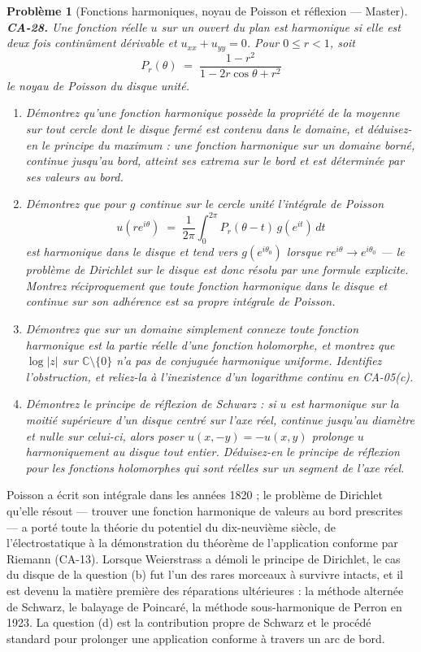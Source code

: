 \documentclass[11pt]{article}
\newtheorem{problem}{Problème}
\begin{document}
\begin{problem}[{Fonctions harmoniques, noyau de Poisson et réflexion --- Master}]
\textbf{CA-28.} Une fonction réelle $ u $ sur un ouvert du plan est \textit{harmonique} si elle
est deux fois continûment dérivable et $ u_{xx} + u_{yy} = 0 $. Pour $ 0 \le r < 1 $, soit
\[ P_r(\theta) \;=\; \frac{1 - r^2}{1 - 2r\cos\theta + r^2} \]
le noyau de Poisson du disque unité.
\begin{enumerate}
\item[(a)] Démontrez qu'une fonction harmonique possède la propriété de la moyenne sur tout cercle dont le
disque fermé est contenu dans le domaine, et déduisez-en le principe du maximum : une fonction
harmonique sur un domaine borné, continue jusqu'au bord, atteint ses extrema sur le bord et est
déterminée par ses valeurs au bord.
\item[(b)] Démontrez que pour $ g $ continue sur le cercle unité l'intégrale de Poisson
\[ u(re^{i\theta}) \;=\; \frac{1}{2\pi} \int_0^{2\pi} P_r(\theta - t)\, g(e^{it})\, dt \]
est harmonique dans le disque et tend vers $ g(e^{i\theta_0}) $ lorsque
$ re^{i\theta} \to e^{i\theta_0} $ --- le problème de Dirichlet sur le disque est donc résolu par
une formule explicite. Montrez réciproquement que toute fonction harmonique dans le disque et
continue sur son adhérence est sa propre intégrale de Poisson.
\item[(c)] Démontrez que sur un domaine simplement connexe toute fonction harmonique est la partie réelle
d'une fonction holomorphe, et montrez que $ \log|z| $ sur $ \mathbb{C} \setminus \{0\} $ n'a pas
de conjuguée harmonique uniforme. Identifiez l'obstruction, et reliez-la à l'inexistence d'un
logarithme continu en CA-05(c).
\item[(d)] Démontrez le principe de réflexion de Schwarz : si $ u $ est harmonique sur la moitié
supérieure d'un disque centré sur l'axe réel, continue jusqu'au diamètre et nulle sur celui-ci,
alors poser $ u(x, -y) = -u(x, y) $ prolonge $ u $ harmoniquement au disque tout entier.
Déduisez-en le principe de réflexion pour les fonctions holomorphes qui sont réelles sur un segment
de l'axe réel.
\end{enumerate}

\end{problem}

\noindent Poisson a écrit son intégrale dans les années 1820 ; le problème de Dirichlet
qu'elle résout --- trouver une fonction harmonique de valeurs au bord prescrites --- a porté toute la
théorie du potentiel du dix-neuvième siècle, de l'électrostatique à la démonstration du théorème de
l'application conforme par Riemann (CA-13). Lorsque Weierstrass a démoli le principe de Dirichlet,
le cas du disque de la question (b) fut l'un des rares morceaux à survivre intacts, et il est devenu
la matière première des réparations ultérieures : la méthode alternée de Schwarz, le balayage de
Poincaré, la méthode sous-harmonique de Perron en 1923. La question (d) est la contribution propre
de Schwarz et le procédé standard pour prolonger une application conforme à travers un arc de
bord.
\end{document}
